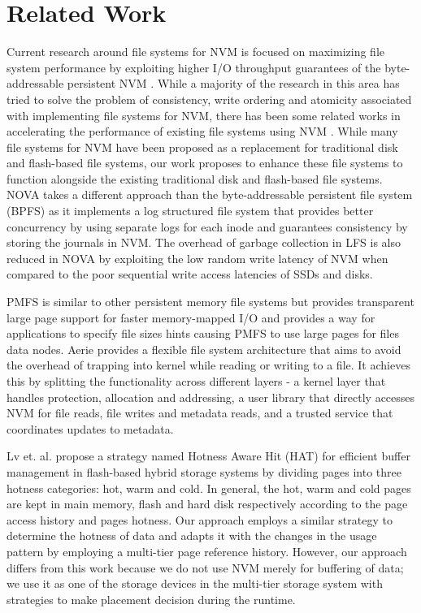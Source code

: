 
\section{Related Work}

Current research around file systems for NVM is focused on maximizing file system performance by exploiting higher I/O throughput guarantees of the byte-addressable persistent NVM \cite{c10,c8,c3,c5}. While a majority of the research in this area has tried to solve the problem of consistency, write ordering and atomicity associated with implementing file systems for NVM, there has been some related works in accelerating the performance of existing file systems using NVM \cite{c11, c12}. While many file systems for NVM have been proposed as a replacement for traditional disk and flash-based file systems, our work proposes to enhance these file systems to function alongside the existing traditional disk and flash-based file systems. 
NOVA \cite{c8} takes a different approach than the byte-addressable persistent file system (BPFS) \cite{c10} as it implements a log structured file system that provides better concurrency by using separate logs for each inode and guarantees consistency by storing the journals in NVM. The overhead of garbage collection in LFS is also reduced in NOVA by exploiting the low random write latency of NVM when compared to the poor sequential write access latencies of SSDs and disks.

PMFS \cite{c3} is similar to other persistent memory file systems but provides transparent large page support for faster memory-mapped I/O and provides a way for applications to specify file sizes hints causing PMFS to use large pages for files data nodes. Aerie \cite{c5} provides a flexible file system architecture that aims to avoid the overhead of trapping into kernel while reading or writing to a file. It achieves this by splitting the functionality across different layers - a kernel layer that handles protection, allocation and addressing, a user library that directly accesses NVM for file reads, file writes and metadata reads, and a trusted service that coordinates updates to metadata.

Lv et. al. \cite{c1} propose a strategy named Hotness Aware Hit (HAT) for efficient buffer management in flash-based hybrid storage systems by dividing pages into three hotness categories: hot, warm and cold. In general, the hot, warm and cold pages are kept in main memory, flash and hard disk respectively according to the page access history and pages hotness. Our approach employs a similar strategy to determine the hotness of data and adapts it with the changes in the usage pattern by employing a multi-tier page reference history. However, our approach differs from this work because we do not use NVM merely for buffering of data; we use it as one of the storage devices in the multi-tier storage system with strategies to make placement decision during the runtime. 

